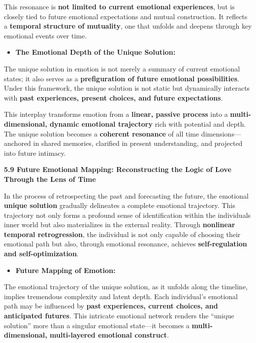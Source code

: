 \documentclass[
]{article}
\begin{document}
This resonance is \textbf{not limited to current emotional experiences},
but is closely tied to future emotional expectations and mutual
construction. It reflects a \textbf{temporal structure of mutuality},
one that unfolds and deepens through key emotional events over time.

\begin{itemize}
\item
  \textbf{The Emotional Depth of the Unique Solution:}
\end{itemize}

The unique solution in emotion is not merely a summary of current
emotional states; it also serves as a \textbf{prefiguration of future
emotional possibilities}. Under this framework, the unique solution is
not static but dynamically interacts with \textbf{past experiences,
present choices, and future expectations}.

This interplay transforms emotion from a \textbf{linear, passive
process} into a \textbf{multi-dimensional, dynamic emotional trajectory}
rich with potential and depth. The unique solution becomes a
\textbf{coherent resonance} of all time dimensions---anchored in shared
memories, clarified in present understanding, and projected into future
intimacy.

\textbf{5.9 Future Emotional Mapping: Reconstructing the Logic of Love
Through the Lens of Time}

In the process of retrospecting the past and forecasting the future, the
emotional \textbf{unique solution} gradually delineates a complete
emotional trajectory. This trajectory not only forms a profound sense of
identification within the individual\textquotesingle s inner world but
also materializes in the external reality. Through \textbf{nonlinear
temporal retrogression}, the individual is not only capable of choosing
their emotional path but also, through emotional resonance, achieves
\textbf{self-regulation and self-optimization}.

\begin{itemize}
\item
  \textbf{Future Mapping of Emotion:}
\end{itemize}

The emotional trajectory of the unique solution, as it unfolds along the
timeline, implies tremendous complexity and latent depth. Each
individual's emotional path may be influenced by \textbf{past
experiences, current choices, and anticipated futures}. This intricate
emotional network renders the ``unique solution'' more than a singular
emotional state---it becomes a \textbf{multi-dimensional, multi-layered
emotional construct}.
\end{document}
